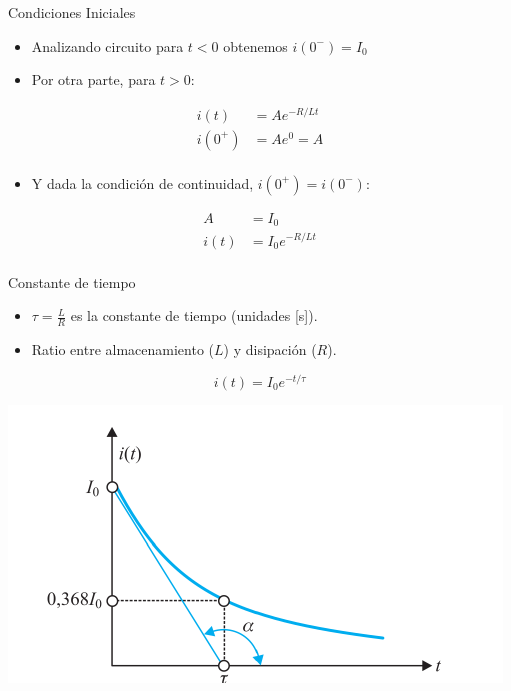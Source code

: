 \documentclass[xcolor={usenames,svgnames,dvipsnames}]{beamer}
\begin{document}
\begin{frame}[label={sec:org00c3fa1}]{Condiciones Iniciales}
\begin{itemize}
\item Analizando circuito para \(t < 0\) obtenemos  \(i(0^-) = I_0\)
\item Por otra parte, para \(t > 0\):
\end{itemize}
\begin{align*}
  i(t) &= A e^{-R/L t}\\
  i(0^+) &= A e^0 = A\\
\end{align*}

\begin{itemize}
\item Y dada la condición de continuidad, \(i(0^+) = i(0^-)\):
\end{itemize}
\begin{align*}
  A &= I_0\\
  i(t) &= I_0 e^{-R/L t}\\
\end{align*}
\end{frame}


\begin{frame}[label={sec:org2b1fc21}]{Constante de tiempo}
\begin{itemize}
\item \(\tau = \frac{L}{R}\) es la constante de tiempo (unidades [s]).
\item Ratio entre almacenamiento (\(L\)) y disipación (\(R\)).
\end{itemize}

\[
  i(t) = I_0 e^{-t/\tau}  
\]

\begin{center}
\includegraphics[width=.9\linewidth]{../figs/RespuestaNatural_RL.pdf}
\end{center}
\end{frame}
\end{document}
